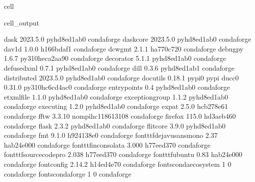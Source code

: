 \documentclass[letterpaper,table,10pt,english]{jupyterBook}
\begin{document}
\begin{sphinxuseclass}{cell}
\begin{sphinxVerbatimOutput}
\begin{sphinxuseclass}{cell_output}
\begin{sphinxVerbatim}[commandchars=\\\{\}]
dask                      2023.5.0           pyhd8ed1ab\PYGZus{}0    conda\PYGZhy{}forge
dask\PYGZhy{}core                 2023.5.0           pyhd8ed1ab\PYGZus{}0    conda\PYGZhy{}forge
dav1d                     1.0.0                h166bdaf\PYGZus{}1    conda\PYGZhy{}forge
dcw\PYGZhy{}gmt                   2.1.1                ha770c72\PYGZus{}0    conda\PYGZhy{}forge
debugpy                   1.6.7           py310heca2aa9\PYGZus{}0    conda\PYGZhy{}forge
decorator                 5.1.1              pyhd8ed1ab\PYGZus{}0    conda\PYGZhy{}forge
defusedxml                0.7.1              pyhd8ed1ab\PYGZus{}0    conda\PYGZhy{}forge
dill                      0.3.6              pyhd8ed1ab\PYGZus{}1    conda\PYGZhy{}forge
distributed               2023.5.0           pyhd8ed1ab\PYGZus{}0    conda\PYGZhy{}forge
docutils                  0.18.1                   pypi\PYGZus{}0    pypi
ducc0                     0.31.0          py310hc6cd4ac\PYGZus{}0    conda\PYGZhy{}forge
entrypoints               0.4                pyhd8ed1ab\PYGZus{}0    conda\PYGZhy{}forge
et\PYGZus{}xmlfile                1.1.0              pyhd8ed1ab\PYGZus{}0    conda\PYGZhy{}forge
exceptiongroup            1.1.2              pyhd8ed1ab\PYGZus{}0    conda\PYGZhy{}forge
executing                 1.2.0              pyhd8ed1ab\PYGZus{}0    conda\PYGZhy{}forge
expat                     2.5.0                hcb278e6\PYGZus{}1    conda\PYGZhy{}forge
fftw                      3.3.10          nompi\PYGZus{}hc118613\PYGZus{}108    conda\PYGZhy{}forge
firefox                   115.0                hd3aeb46\PYGZus{}0    conda\PYGZhy{}forge
flask                     2.3.2              pyhd8ed1ab\PYGZus{}0    conda\PYGZhy{}forge
flit\PYGZhy{}core                 3.9.0              pyhd8ed1ab\PYGZus{}0    conda\PYGZhy{}forge
fmt                       9.1.0                h924138e\PYGZus{}0    conda\PYGZhy{}forge
font\PYGZhy{}ttf\PYGZhy{}dejavu\PYGZhy{}sans\PYGZhy{}mono 2.37                 hab24e00\PYGZus{}0    conda\PYGZhy{}forge
font\PYGZhy{}ttf\PYGZhy{}inconsolata      3.000                h77eed37\PYGZus{}0    conda\PYGZhy{}forge
font\PYGZhy{}ttf\PYGZhy{}source\PYGZhy{}code\PYGZhy{}pro  2.038                h77eed37\PYGZus{}0    conda\PYGZhy{}forge
font\PYGZhy{}ttf\PYGZhy{}ubuntu           0.83                 hab24e00\PYGZus{}0    conda\PYGZhy{}forge
fontconfig                2.14.2               h14ed4e7\PYGZus{}0    conda\PYGZhy{}forge
fonts\PYGZhy{}conda\PYGZhy{}ecosystem     1                             0    conda\PYGZhy{}forge
fonts\PYGZhy{}conda\PYGZhy{}forge         1                             0    conda\PYGZhy{}forge

\end{sphinxVerbatim}
\end{sphinxuseclass}
\end{sphinxVerbatimOutput}
\end{sphinxuseclass}
\end{document}
